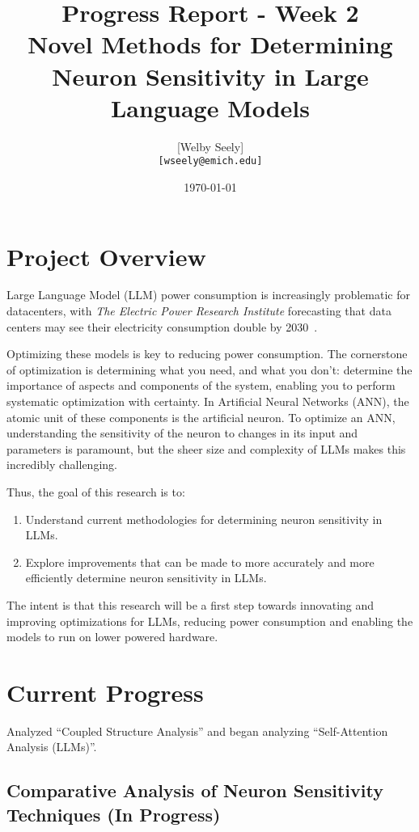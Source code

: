 \documentclass{article}
\title{Progress Report - Week 2 \\
\large Novel Methods for Determining Neuron Sensitivity in Large Language Models}
\author{
    [Welby Seely] \\
    \texttt{[wseely@emich.edu]}
}
\date{\today}
\begin{document}
    \maketitle

    \section*{Project Overview}
    Large Language Model (LLM) power consumption is increasingly problematic for datacenters, with \textit{The Electric Power
    Research Institute} forecasting that data centers may see their electricity consumption double by
    2030~\cite{kindig2024}.

    Optimizing these models is key to reducing power consumption.
    The cornerstone of optimization is determining what you need, and what you don't: determine the importance of
    aspects and components of the system, enabling you to perform systematic optimization with certainty.
    In Artificial Neural Networks (ANN), the atomic unit of these components is the artificial neuron.
    To optimize an ANN, understanding the sensitivity of the neuron to changes in its input and parameters is paramount,
    but the sheer size and complexity of LLMs makes this incredibly challenging.

    Thus, the goal of this research is to:
    \begin{enumerate}
        \item Understand current methodologies for determining neuron sensitivity in LLMs.
        \item Explore improvements that can be made to more accurately and more efficiently determine neuron sensitivity in
        LLMs.
    \end{enumerate}

    The intent is that this research will be a first step towards innovating and improving optimizations for LLMs,
    reducing power consumption and enabling the models to run on lower powered hardware.

    \section*{Current Progress}
    Analyzed ``Coupled Structure Analysis'' and began analyzing ``Self-Attention Analysis (LLMs)''.
    \subsection*{Comparative Analysis of Neuron Sensitivity Techniques (In Progress)}
    
\end{document}

